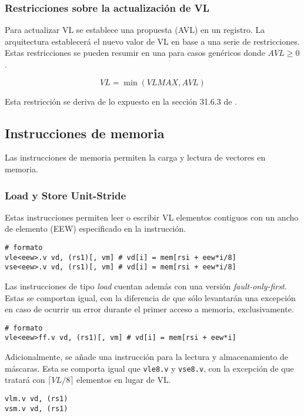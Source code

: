 \subsubsection{Restricciones sobre la actualización de VL}
Para actualizar VL se establece una propuesta (AVL) en un registro. La
arquitectura establecerá el nuevo valor de VL en base a una serie de
restricciones. Estas restricciones se pueden resumir en una para casos
genéricos donde $AVL \ge 0$.

$$VL = \min(VLMAX, AVL)$$

Esta restricción se deriva de lo expuesto en la sección 31.6.3 de \cite{riscv-isa2024}.

\subsection{Instrucciones de memoria}
Las instrucciones de memoria permiten la carga y lectura de vectores en memoria.

\subsubsection{Load y Store Unit-Stride}
Estas instrucciones permiten leer o escribir VL elementos contiguos con un
ancho de elemento (EEW) especificado en la instrucción.

\begin{lstlisting}
# formato
vle<eew>.v vd, (rs1)[, vm] # vd[i] = mem[rsi + eew*i/8]
vse<eew>.v vd, (rs1)[, vm] # vd[i] = mem[rsi + eew*i/8]
\end{lstlisting}

Las instrucciones de tipo \textit{load} cuentan además con una versión
\textit{fault-only-first}. Estas se comportan igual, con la diferencia de que
sólo levantarán una excepción en caso de ocurrir un error durante el primer
acceso a memoria, exclusivamente.

\begin{lstlisting}
# formato
vle<eew>ff.v vd, (rs1)[, vm] # vd[i] = mem[rsi + eew*i]
\end{lstlisting}

Adicionalmente, se añade una instrucción para la lectura y almacenamiento de
máscaras. Esta se comporta igual que \texttt{vle8.v} y \texttt{vse8.v}, con la
excepción de que tratará con $\lceil VL / 8\rceil$ elementos en lugar de VL.

\begin{lstlisting}
vlm.v vd, (rs1)
vsm.v vd, (rs1)
\end{lstlisting}

